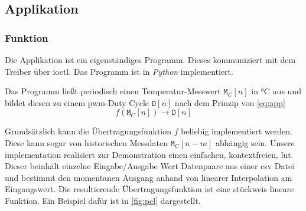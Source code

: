 \subsection{Applikation}

\subsubsection{Funktion}

Die Applikation ist ein eigenständiges Programm.
Dieses kommuniziert mit dem Treiber über \gls{ioctl}.
Das Programm ist in \textit{Python} implementiert.

Das Programm ließt periodisch einen Temperatur-Messwert $\texttt{M}_C[n]$ in \si{\celsius} aus und bildet diesen zu einem \gls{pwm}-Duty Cycle $\texttt{D}[n]$ nach dem Prinzip von \autoref{eq:app}
\begin{equation}
    f \left( \texttt{M}_C \left[n\right] \right) \rightarrow \texttt{D}\left[n\right]
    \label{eq:app}
\end{equation}

Grundsätzlich kann die Übertragungsfunktion $f$ beliebig implementiert werden.
Diese kann sogar von historischen Messdaten $\texttt{M}_C[n-m]$ abhängig sein.
Unsere implementation realisiert zur Demonstration einen einfachen, kontextfreien, \gls{lut}.
Dieser beinhält einzelne Eingabe/Ausgabe Wert Datenpaare aus einer \gls{csv} Datei und bestimmt den momentanen Ausgang anhand von linearer Interpolation am Eingangswert.
Die resultierende Übertragungsfunktion ist eine stückweis lineare Funktion.
Ein Beispiel dafür ist in \autoref{fig:pcl} dargestellt.

